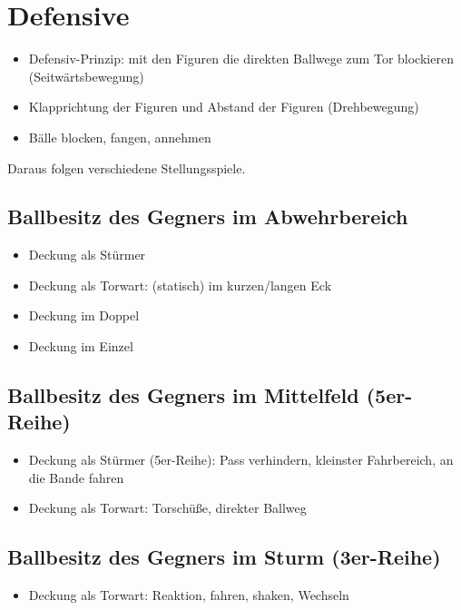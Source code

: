 \section{Defensive}
\label{technik:defensive}

\begin{itemize}
\item Defensiv-Prinzip: mit den Figuren die direkten Ballwege zum Tor blockieren (Seitwärtsbewegung)  
\item Klapprichtung der Figuren und Abstand der Figuren (Drehbewegung)
\item Bälle blocken, fangen, annehmen 
\end{itemize}
Daraus folgen verschiedene Stellungsspiele.


\subsection{Ballbesitz des Gegners im Abwehrbereich}
\label{technik:defensive:gegnerabwehr}

\begin{itemize}
\item Deckung als Stürmer
\item Deckung als Torwart: (statisch) im kurzen/langen Eck
\item Deckung im Doppel
\item Deckung im Einzel
\end{itemize}


\subsection{Ballbesitz des Gegners im Mittelfeld (5er-Reihe)}
\label{technik:defensive:gegnerabwehr}

\begin{itemize}
\item Deckung als Stürmer (5er-Reihe): Pass verhindern, kleinster Fahrbereich, an die Bande fahren
\item Deckung als Torwart: Torschüße, direkter Ballweg
\end{itemize}


\subsection{Ballbesitz des Gegners im Sturm (3er-Reihe)}
\label{technik:defensive:gegnerabwehr}

\begin{itemize}
\item Deckung als Torwart: Reaktion, fahren, shaken, Wechseln
\end{itemize}

